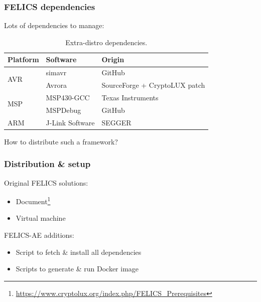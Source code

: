 \documentclass[english]{beamer}
\begin{document}
\begin{frame}
  \frametitle{FELICS dependencies}

  Lots of dependencies to manage:

  \begin{table}[H]
    \centering
    \begin{tabular}{l|l|l}
      \textbf{Platform} & \textbf{Software} & \textbf{Origin}               \\
      \hline
      \multirow{2}{*}{AVR}
                        & simavr            & GitHub                        \\
                        & Avrora            & SourceForge + CryptoLUX patch \\
      \hline
      \multirow{2}{*}{MSP}
                        & MSP430-GCC        & Texas Instruments             \\
                        & MSPDebug          & GitHub                        \\
      \hline
      \multirow{1}{*}{ARM}
                        & J-Link Software   & SEGGER                        \\
      \hline
    \end{tabular}
    \caption{Extra-distro dependencies.}
    \label{table:dependencies}
  \end{table}

  How to distribute such a framework?

\end{frame}

\begin{frame}
  \frametitle{Distribution \& setup}

  Original FELICS solutions:

  \begin{itemize}
  \item Document\footnote{\url{https://www.cryptolux.org/index.php/FELICS_Prerequisites}}
  \item Virtual machine
  \end{itemize}

  \pause

  FELICS-AE additions:

  \begin{itemize}
  \item Script to fetch \& install all dependencies
  \item Scripts to generate \& run Docker image
  \end{itemize}

\end{frame}
\end{document}

